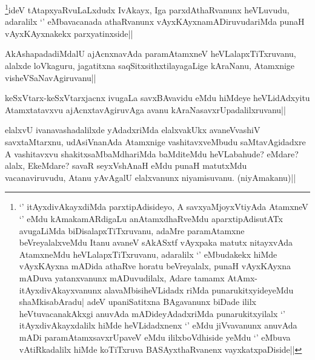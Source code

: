 
\begin{artha}
\footnote{`\stext' itAyxdivAkayxdiMda parxtipAdisideyo, A savxyaMjoyxVtiyAda AtamxneV `\stext' eMdu kAmakamARdigaLu anAtamxdhaRveMdu aparxtipAdisutATx avugaLiMda biDisalapxTiTxruvanu, adaMre paramAtamxne beVreyalalxveMdu Itanu avaneV sAkASxtf vAyxpaka matutx nitayxvAda AtamxneMdu heVLalapxTiTxruvanu, adaralilx `\stext' eMbudakekx hiMde vAyxKAyxna mADida athaRve horatu beVreyalalx, punaH vAyxKAyxna mADuva yatanxvanunx mADuvudilalx, Adare tamamx AtAmx- itAyxdivAkayxvanunx alavaMbisiheVLidadx riMda punarukitxyideyeMdu shaMkisabAradu| adeV upaniSatitxna BAgavanunx biDade ililx heVtuvacanakAkxgi anuvAda mADideyAdadxriMda punarukitxyilalx `\stext' itAyxdivAkayxdalilx hiMde heVLidadxnenx `\stext' eMdu jiVvavanunx anuvAda mADi paramAtamxsavxrUpaveV eMdu ililxboVdhiside yeMdu `\stext' eMbuva vAtiRkadalilx hiMde koTiTxruva BASAyxthaRvanenx vayxkatxpaDiside||}ideV tAtapxyaRvuLaLxdudx IvAkayx, Iga parxdAthaRvanunx heVLuvudu, adaralilx `\stext' eMbavacanada athaRvanunx vAyxKAyxnamADiruvudariMda punaH vAyxKAyxnakekx parxyatinxside||
\end{artha}



\begin{artha}
AkAshapadadiMdalU ajAcnxnavAda paramAtamxneV heVLalapxTiTxruvanu, alalxde loVkaguru, jagatitxna saqSitxsithxtilayagaLige kAraNanu, Atamxnige visheVSaNavAgiruvanu||
\end{artha}

\begin{artha}
keSxVtarx-keSxVtarxjacnx ivugaLa savxBAvavidu eMdu hiMdeye heVLidAdxyitu Atamxtatavxvu ajAcnxtavAgiruvAga avanu kAraNasavxrUpadalilxruvanu||
\end{artha}


\begin{artha}
elalxvU ivanavashadalilxde yAdadxriMda elalxvakUkx avaneVvashiV savxtaMtarxnu, udAsiVnanAda Atamxnige vashitavxveMbudu saMtavAgidadxre A vashitavxvu shakitxsaMbaMdhariMda baMditeMdu heVLabahude? eMdare? alalx, EkeMdare? savaR seyxVshAnaH eMdu punaH matutxMdu vacanaviruvudu, Atanu yAvAgalU elalxvanunx niyamisuvanu. (niyAmakanu)||
\end{artha}

